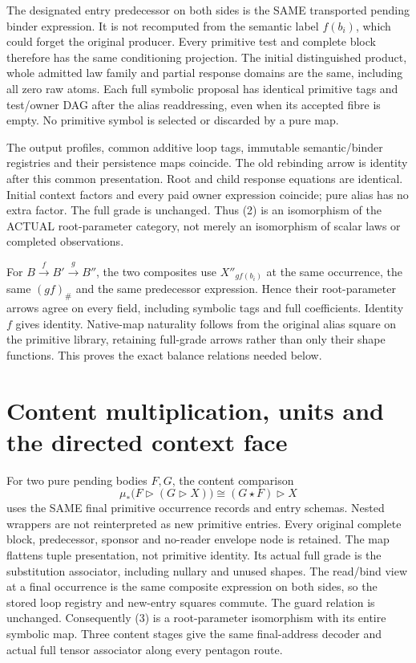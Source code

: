 \documentclass[11pt]{article}
\begin{document}
The designated entry predecessor on both sides is the SAME transported pending binder expression. It is not recomputed from the semantic label $f(b_i)$, which could forget the original producer. Every primitive test and complete block therefore has the same conditioning projection. The initial distinguished product, whole admitted law family and partial response domains are the same, including all zero raw atoms. Each full symbolic proposal has identical primitive tags and test/owner DAG after the alias readdressing, even when its accepted fibre is empty. No primitive symbol is selected or discarded by a pure map.

The output profiles, common additive loop tags, immutable semantic/binder registries and their persistence maps coincide. The old rebinding arrow is identity after this common presentation. Root and child response equations are identical. Initial context factors and every paid owner expression coincide; pure alias has no extra factor. The full grade is unchanged. Thus (2) is an isomorphism of the ACTUAL root-parameter category, not merely an isomorphism of scalar laws or completed observations.

For $B\xrightarrow f B'\xrightarrow g B''$, the two composites use $X''_{gf(b_i)}$ at the same occurrence, the same $(gf)_\#$ and the same predecessor expression. Hence their root-parameter arrows agree on every field, including symbolic tags and full coefficients. Identity $f$ gives identity. Native-map naturality follows from the original alias square on the primitive library, retaining full-grade arrows rather than only their shape functions. This proves the exact balance relations needed below.

\section{Content multiplication, units and the directed context face}
For two pure pending bodies $F,G$, the content comparison
\[
 \mu_*\bigl(F\triangleright(G\triangleright X)\bigr)
          \cong (G\star F)\triangleright X               \tag{3}
\]
uses the SAME final primitive occurrence records and entry schemas. Nested wrappers are not reinterpreted as new primitive entries. Every original complete block, predecessor, sponsor and no-reader envelope node is retained. The map flattens tuple presentation, not primitive identity. Its actual full grade is the substitution associator, including nullary and unused shapes. The read/bind view at a final occurrence is the same composite expression on both sides, so the stored loop registry and new-entry squares commute. The guard relation is unchanged. Consequently (3) is a root-parameter isomorphism with its entire symbolic map. Three content stages give the same final-address decoder and actual full tensor associator along every pentagon route.
\end{document}
